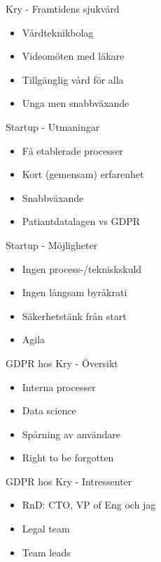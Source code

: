 \documentclass[10pt, compress]{beamer}
\begin{document}
\begin{frame}{Kry - Framtidens sjukvård}

 \begin{itemize}
  \item Vårdteknikbolag
  \item Videomöten med läkare
  \item Tillgänglig vård för alla
  \item Unga men snabbväxande
  \end{itemize}    

\end{frame}

\begin{frame}{Startup - Utmaningar}

 \begin{itemize}
  \item Få etablerade processer
  \item Kort (gemensam) erfarenhet
  \item Snabbväxande
  \item Patiantdatalagen vs GDPR
  \end{itemize}    

\end{frame}

\begin{frame}{Startup - Möjligheter}

 \begin{itemize}
  \item Ingen process-/tekniskskuld
  \item Ingen långsam byråkrati
  \item Säkerhetstänk från start
  \item Agila
  \end{itemize}    

\end{frame}

\begin{frame}{GDPR hos Kry - Översikt}

 \begin{itemize}
  \item Interna processer
  \item Data science
  \item Spårning av användare
  \item Right to be forgotten
  \end{itemize}    

\end{frame}

\begin{frame}{GDPR hos Kry - Intressenter}

 \begin{itemize}
  \item RnD: CTO, VP of Eng och jag
  \item Legal team
  \item Team leads
  \end{itemize}    

\end{frame}
\end{document}
